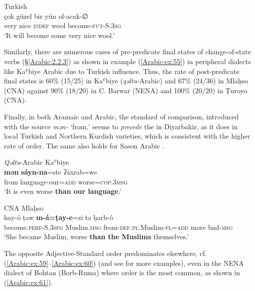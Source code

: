 \documentclass[output=paper,colorlinks,citecolor=brown,draftmode]{langscibook}
\begin{document}
\ea\label{Arabic:ex:56}
Turkish\\
\gll çok güzel bir yün ol-acak-∅ \\
very nice \textsc{indef} wool become\textsc{-fut-S.3sg} \\
\glt `It will become some very nice wool.'
\z

Similarly, there are numerous cases of pre-predicate final states of change-of-state verbs (§\ref{Arabic:2.2.3}) as shown in example (\ref{Arabic:ex:55}) in peripheral dialects like Kaʿbiye Arabic due to Turkish influence. Thus, the rate of post-predicate final states is 60\% (15/25) in Kaʿbiye (\textit{qəltu-}Arabic) and 67\% (24/36) in Mlaḥso (CNA) against 90\% (18/20) in C. Barwar (NENA) and 100\% (20/20) in Ṭuroyo (CNA).

Finally, in both Aramaic and Arabic, the standard of comparison, introduced with the source  \textit{mən-} `from,' seems to \textit{precede} the  in Diyarbakir, as it does in local Turkish and Northern Kurdish varieties, which is consistent with the higher rate of  order. The same also holds for Sason Arabic \citep[144--145]{Akkus2020AA}. 

\ea\label{Arabic:ex:57}
\textit{Qəltu}-Arabic Kaʿbiye \citep[IX:§19]{Jastrow2022CADiyarbakir} \\
\gll \textbf{mən} \textbf{sáyn-na}=ste ʔáxrab=we \\
from language-our\textsc{=add} worse\textsc{=cop.3msg}  \\
\glt `It is even worse \textbf{than our language}.'
\z

\ea\label{Arabic:ex:58}
CNA Mlaḥso \citep[112.§48]{Jastrow1994Mlahso} \\
\gll hay-ó ṭaw \textbf{m-á=ṭay-e}=zi tə ḥarb-ó \\
become\textsc{.perf-S.3sfg} Muslim\textsc{.msg} from\textsc{-def.pl.}Muslim\textsc{-pl=add} more bad\textsc{-msg} \\
\glt `She became Muslim, worse \textbf{than the Muslims} themselves.'
\z

\begin{sloppypar}
The opposite Adjective-Standard order predominates elsewhere, cf. (\ref{Arabic:ex:59}--\ref{Arabic:ex:60}) (and see \citealt[50--51, 117--118]{Waltisberg2016STuroyo} for more examples), even in the NENA dialect of Bohtan (Borb-Ruma) where  order is the most common, as shown in (\ref{Arabic:ex:61}).
\end{sloppypar}
\end{document}
